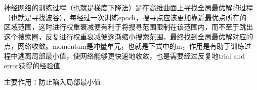 	神经网络的训练过程（也就是梯度下降法）是在高维曲面上寻找全局最优解的过程（也就是寻找波谷），每经过一次训练epoch，搜寻点应该更加靠近最优点所在的区域范围，这时进行权重衰减便有利于将搜寻范围限制在该范围内，而不至于跳出这个搜索圈，反复进行权重衰减便逐渐缩小搜索范围，最终找到全局最优解对应的点，网络收敛。momentum是冲量单元，也就是下式中的m，作用是有助于训练过程中逃离局部最小值，使网络能够更快速地收敛，也是需要经过反复地trial and error获得的经验值
	
	主要作用：防止陷入局部最小值











